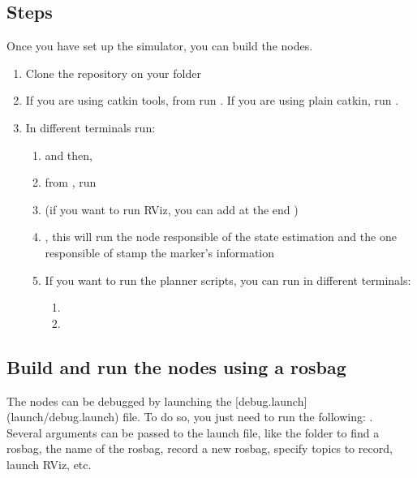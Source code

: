 \subsection*{Steps}
Once you have set up the simulator, you can build the nodes.
\begin{enumerate}
    \item{Clone the repository on your  folder}
    \item{If you are using catkin tools, from  run . If you are using plain catkin, run .}
    \item{In different terminals run:
        \begin{enumerate}
            \item{ and then, }
            \item{from , run }
            \item{ (if you want to run \ac{RViz}, you can add at the end )}
            \item{, this will run the node responsible of the state estimation and the one responsible of stamp the marker's information}
            \item{If you want to run the planner scripts, you can run in different terminals:
                \begin{enumerate}
                    \item{}
                    \item{}
                \end{enumerate}
            }
        \end{enumerate}
    }
\end{enumerate}

\subsection*{Build and run the nodes using a rosbag}
The nodes can be debugged by launching the [debug.launch](launch/debug.launch) file. To do so, you just need to run the following: .\\

Several arguments can be passed to the launch file, like the folder to find a rosbag, the name of the rosbag, record a new rosbag, specify topics to record, launch \ac{RViz}, etc.


